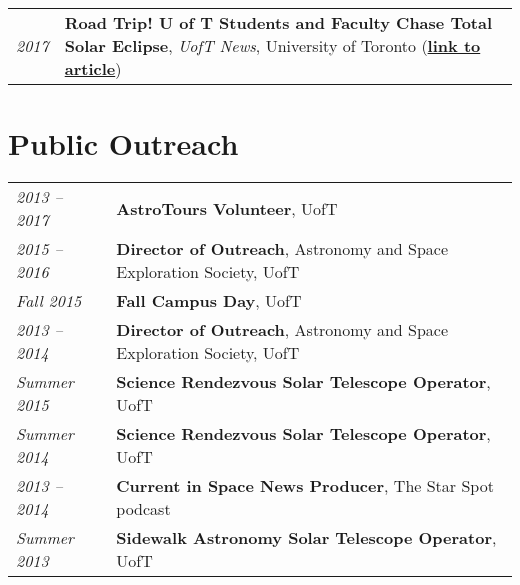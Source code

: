 \documentclass[10pt]{res} %
\begin{document}
\begin{resume}
\begin{table}[h!]
\begin{tabularx}{\textwidth}{lX}
\textit{2017} & \textbf{Road Trip! U of T Students and Faculty Chase Total Solar Eclipse}, \textit{UofT News}, University of Toronto (\href{https://www.utoronto.ca/news/road-trip-u-t-students-and-faculty-chase-total-solar-eclipse}{\textbf{link to article}})
\end{tabularx}
\end{table}


\newpage
\section{\Large Public Outreach}
\vspace{-5pt} %
\noindent\makebox[\linewidth]{\rule{\textwidth}{0.4pt}}
\vspace{-20pt} %

\begin{table}[h!]
\begin{tabularx}{\textwidth}{lX}
\textit{2013 -- 2017} & \textbf{AstroTours Volunteer}, UofT \\
\textit{2015 -- 2016} & \textbf{Director of Outreach}, Astronomy and Space Exploration Society, UofT \\
\textit{Fall 2015} & \textbf{Fall Campus Day}, UofT \\
\textit{2013 -- 2014} & \textbf{Director of Outreach}, Astronomy and Space Exploration Society, UofT \\
\textit{Summer 2015} & \textbf{Science Rendezvous Solar Telescope Operator}, UofT \\
\textit{Summer 2014} & \textbf{Science Rendezvous Solar Telescope Operator}, UofT \\
\textit{2013 -- 2014} & \textbf{Current in Space News Producer}, The Star Spot podcast \\
\textit{Summer 2013} & \textbf{Sidewalk Astronomy Solar Telescope Operator}, UofT
\end{tabularx}
\end{table}



\end{resume} 
\end{document}
